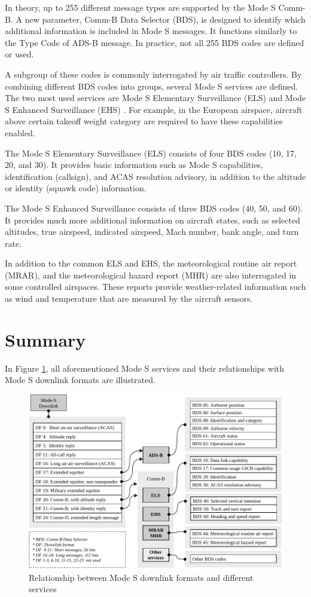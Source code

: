 In theory, up to 255 different message types are supported by the Mode S Comm-B. A new parameter, Comm-B Data Selector (BDS), is designed to identify which additional information is included in Mode S messages. It functions similarly to the Type Code of ADS-B message. In practice, not all 255 BDS codes are defined or used. 

A subgroup of these codes is commonly interrogated by air traffic controllers. By combining different BDS codes into groups, several Mode S services are defined. The two most used services are Mode S Elementary Surveillance (ELS) and Mode S Enhanced Surveillance (EHS) \cite{grappel2008}. For example, in the European airspace, aircraft above certain takeoff weight category are required to have these capabilities enabled.

The Mode S Elementary Surveillance (ELS) consists of four BDS codes (10, 17, 20, and 30). It provides basic information such as Mode S capabilities, identification (callsign), and ACAS resolution advisory, in addition to the altitude or identity (squawk code) information. 

The Mode S Enhanced Surveillance consists of three BDS codes (40, 50, and 60). It provides much more additional information on aircraft states, such as selected altitudes, true airspeed, indicated airspeed, Mach number, bank angle, and turn rate.

In addition to the common ELS and EHS, the meteorological routine air report (MRAR), and the meteorological hazard report (MHR) are also interrogated in some controlled airspaces. These reports provide weather-related information such as wind and temperature that are measured by the aircraft sensors.


\section{Summary}

In Figure \ref{fig:mode_s_services}, all aforementioned Mode S services and their relationships with Mode S downlink formats are illustrated.

\begin{figure}[ht]
  \centering
  \includegraphics[width=\textwidth]{figures/intro/mode_s_services.pdf}
  \caption{Relationship between Mode S downlink formats and different services}
  \label{fig:mode_s_services}
\end{figure}


